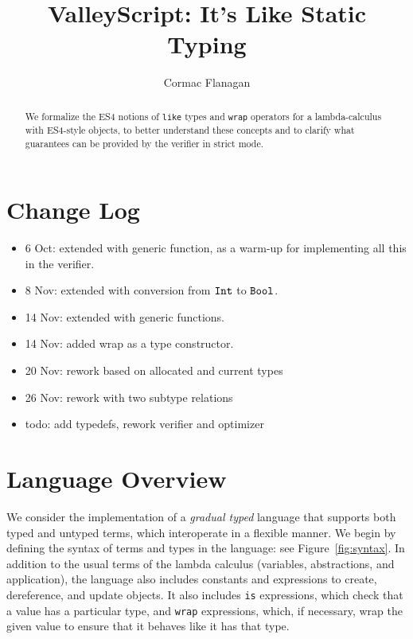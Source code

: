 \documentclass{article}
\newcommand{\Int}{\t{Int}}
\newcommand{\Bool}{\t{Bool}}
\renewcommand{\t}[1]{{\tt #1}}
\begin{document}
\title{ValleyScript: It's Like Static Typing
}
\author{Cormac Flanagan}


\maketitle

\begin{abstract}
We formalize the ES4 notions of \t{like} types and \t{wrap} operators for a lambda-calculus with ES4-style objects,
to better understand these concepts and to clarify what guarantees can be provided by the verifier in strict mode.
\end{abstract}

\section{Change Log}
\begin{itemize}
\item
6 Oct: extended with generic function, as a warm-up for implementing all this in the verifier.
\item
8 Nov: extended with conversion from $\Int$ to $\Bool$.
\item
14 Nov: extended with generic functions.
\item
14 Nov: added wrap as a type constructor.
\item 
20 Nov: rework based on allocated and current types
\item
26 Nov: rework with two subtype relations
\item
todo: add typedefs, rework verifier and optimizer
\end{itemize}

\clearpage
\section{Language Overview}

We consider the implementation of a \emph{gradual typed} language that supports both
typed and untyped terms, which interoperate in a flexible manner.
We begin by defining the syntax of terms and types in the language: see Figure~\ref{fig:syntax}.
In addition to the usual terms of the lambda calculus (variables, abstractions, and application), 
the language also includes constants and expressions to create, dereference, and update objects.
It also includes \t{is} expressions, which check that a value has a particular type,
and \t{wrap} expressions, which, if necessary, wrap the given value to ensure that it behaves like it has that type. 
\end{document}
